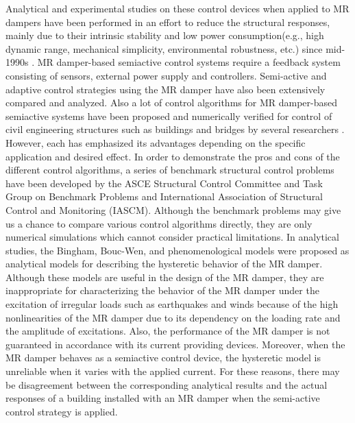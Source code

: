 Analytical and experimental studies on these control devices when applied to MR dampers have been performed in an effort to reduce the structural responses, mainly due to their intrinsic stability and low power consumption(e.g., high dynamic range, mechanical simplicity, environmental robustness, etc.) since mid-1990s \citep{dyke1994experimental, spencer1997phenomenological}. MR damper-based semiactive control systems require a feedback system consisting of sensors, external power supply and controllers. Semi-active and adaptive control strategies using the MR damper have also been extensively compared and analyzed\citep{jansen2000semiactive,kim2009semiactive,bitaraf2010adaptive}. Also a lot of control algorithms for MR damper-based semiactive systems have been proposed and numerically verified for control of civil engineering structures such as buildings and bridges by several researchers \citep{jansen2000semiactive,zhou2003adaptive}. However, each has emphasized its advantages depending on the specific application and desired effect. In order to demonstrate the pros and cons of the different control algorithms, a series of benchmark structural control problems have been developed by the ASCE Structural Control Committee and Task Group on Benchmark Problems and International Association of Structural Control and Monitoring (IASCM). Although the benchmark problems may give us a chance to compare various control algorithms directly, they are only numerical simulations which cannot consider practical limitations. In analytical studies, the Bingham, Bouc-Wen, and phenomenological models were proposed as analytical models for describing the hysteretic behavior of the MR damper\citep{spencer1997phenomenological,yang2004dynamic}. Although these models are useful in the design of the MR damper, they are inappropriate for characterizing the behavior of the MR damper under the excitation of irregular loads such as earthquakes and winds because of the high nonlinearities of the MR damper due to its dependency on the loading rate and the amplitude of excitations. Also, the performance of the MR damper is not guaranteed in accordance with its current providing devices. Moreover, when the MR damper behaves as a semiactive control device, the hysteretic model is unreliable when it varies with the applied current\citep{lee2006semi}. For these reasons, there may be disagreement between the corresponding analytical results and the actual responses of a building installed with an MR damper when the semi-active control strategy is applied.